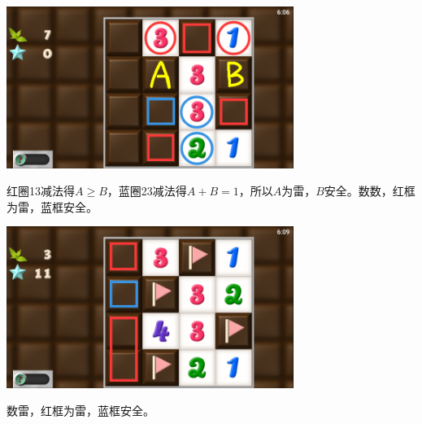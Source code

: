 \subsection{} %
\begin{center}
    \includegraphics[width=0.7\textwidth]{puzzle/102-1.png}
\end{center}
红圈13减法得$A\ge B$，蓝圈23减法得$A+B=1$，所以$A$为雷，$B$安全。数数，红框为雷，蓝框安全。
\begin{center}
    \includegraphics[width=0.7\textwidth]{puzzle/102-2.png}
\end{center}
数雷，红框为雷，蓝框安全。

